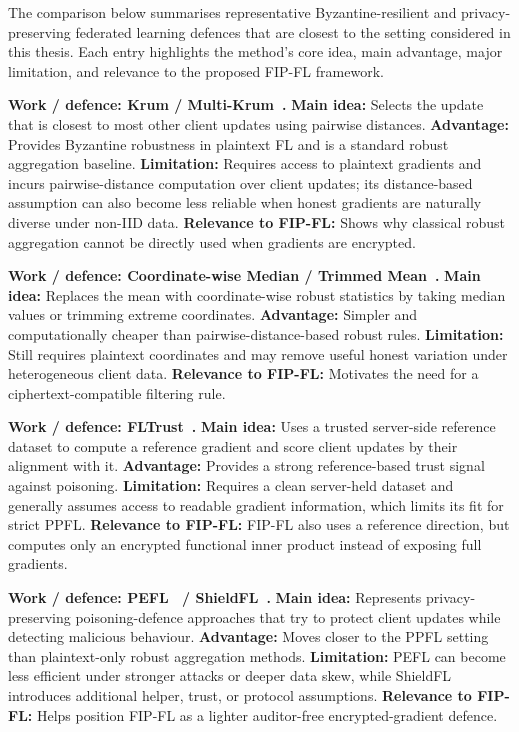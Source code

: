The comparison below summarises representative Byzantine-resilient and privacy-preserving federated learning defences that are closest to the setting considered in this thesis. Each entry highlights the method's core idea, main advantage, major limitation, and relevance to the proposed FIP-FL framework.

\noindent\textbf{Work / defence: Krum / Multi-Krum~\cite{blanchard2017machine}.}
\textbf{Main idea:} Selects the update that is closest to most other client updates using pairwise distances.
\textbf{Advantage:} Provides Byzantine robustness in plaintext FL and is a standard robust aggregation baseline.
\textbf{Limitation:} Requires access to plaintext gradients and incurs pairwise-distance computation over client updates; its distance-based assumption can also become less reliable when honest gradients are naturally diverse under non-IID data.
\textbf{Relevance to FIP-FL:} Shows why classical robust aggregation cannot be directly used when gradients are encrypted.

\noindent\textbf{Work / defence: Coordinate-wise Median / Trimmed Mean~\cite{yin2018byzantine}.}
\textbf{Main idea:} Replaces the mean with coordinate-wise robust statistics by taking median values or trimming extreme coordinates.
\textbf{Advantage:} Simpler and computationally cheaper than pairwise-distance-based robust rules.
\textbf{Limitation:} Still requires plaintext coordinates and may remove useful honest variation under heterogeneous client data.
\textbf{Relevance to FIP-FL:} Motivates the need for a ciphertext-compatible filtering rule.

\noindent\textbf{Work / defence: FLTrust~\cite{cao2021fltrust}.}
\textbf{Main idea:} Uses a trusted server-side reference dataset to compute a reference gradient and score client updates by their alignment with it.
\textbf{Advantage:} Provides a strong reference-based trust signal against poisoning.
\textbf{Limitation:} Requires a clean server-held dataset and generally assumes access to readable gradient information, which limits its fit for strict PPFL.
\textbf{Relevance to FIP-FL:} FIP-FL also uses a reference direction, but computes only an encrypted functional inner product instead of exposing full gradients.

\noindent\textbf{Work / defence: PEFL~\cite{liu2021privacy} / ShieldFL~\cite{ma2022shieldfl}.}
\textbf{Main idea:} Represents privacy-preserving poisoning-defence approaches that try to protect client updates while detecting malicious behaviour.
\textbf{Advantage:} Moves closer to the PPFL setting than plaintext-only robust aggregation methods.
\textbf{Limitation:} PEFL can become less efficient under stronger attacks or deeper data skew, while ShieldFL introduces additional helper, trust, or protocol assumptions.
\textbf{Relevance to FIP-FL:} Helps position FIP-FL as a lighter auditor-free encrypted-gradient defence.

